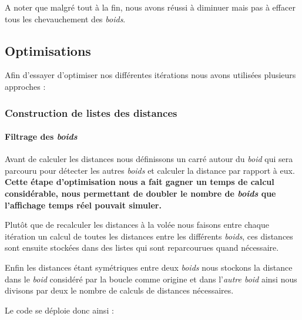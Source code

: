 \documentclass[
]{article}
\begin{document}
A noter que malgré tout à la fin, nous avons réussi à diminuer mais pas
à effacer tous les chevauchement des \emph{boids}.

\hypertarget{optimisations}{%
\subsection{Optimisations}\label{optimisations}}

Afin d'essayer d'optimiser nos différentes itérations nous avons
utilisées plusieurs approches :

\hypertarget{construction-de-listes-des-distances}{%
\subsubsection{Construction de listes des
distances}\label{construction-de-listes-des-distances}}

\hypertarget{filtrage-des-boids}{%
\paragraph{\texorpdfstring{Filtrage des
\emph{boids}}{Filtrage des boids}}\label{filtrage-des-boids}}

Avant de calculer les distances nous définissons un carré autour du
\emph{boid} qui sera parcouru pour détecter les autres \emph{boids} et
calculer la distance par rapport à eux. \textbf{Cette étape
d'optimisation nous a fait gagner un temps de calcul considérable, nous
permettant de doubler le nombre de \emph{boids} que l'affichage temps
réel pouvait simuler.}

Plutôt que de recalculer les distances à la volée nous faisons entre
chaque itération un calcul de toutes les distances entre les différents
\emph{boids}, ces distances sont ensuite stockées dans des listes qui
sont reparcourues quand nécessaire.

Enfin les distances étant symétriques entre deux \emph{boids} nous
stockons la distance dans le \emph{boid} considéré par la boucle comme
origine et dans l'\emph{autre boid} ainsi nous divisons par deux le
nombre de calculs de distances nécessaires.

Le code se déploie donc ainsi :
\end{document}
